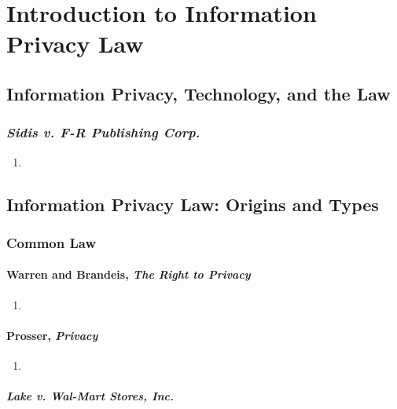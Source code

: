 \section{Introduction to Information Privacy Law}

\subsection{Information Privacy, Technology, and the Law}

\subsubsection{\emph{Sidis v. F-R Publishing Corp.}}

\begin{enumerate}
    \item %
\end{enumerate}

\subsection{Information Privacy Law: Origins and Types}

\subsubsection{Common Law}

\paragraph{Warren and Brandeis, \emph{The Right to Privacy}}

\begin{enumerate}
    \item %
\end{enumerate}

\paragraph{Prosser, \emph{Privacy}}

\begin{enumerate}
    \item %
\end{enumerate}

\paragraph{\emph{Lake v. Wal-Mart Stores, Inc.}}

